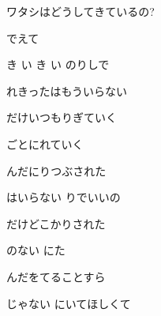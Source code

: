 \documentclass[14pt]{ltjsarticle}
\begin{document}
{  
ワタシはどうしてきているの?
  \jisho{}

  でえて
  \jisho{}

\item
  き い き い のりしで
  \jisho{}

  れきったはもういらない
  \jisho{}

\item
  だけいつもりぎていく
  \jisho{}

  ごとにれていく
  \jisho{}

  んだにりつぶされた
  \jisho{}

  はいらない りでいいの
  \jisho{}

\item
  だけどこかりされた
  \jisho{}

  のない にた
  \jisho{}

  んだをてることすら
  \jisho{}

  じゃない にいてほしくて
  \jisho{}

  
}
\end{document}
